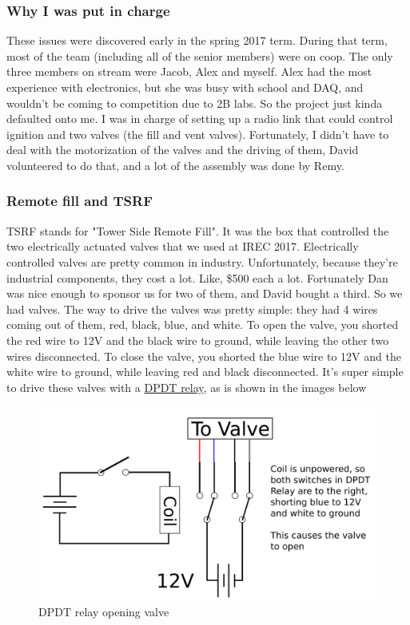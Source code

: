 \documentclass[11pt]{article}
\begin{document}
\subsubsection{Why I was put in charge}
\label{sec:orgd3222d4}

These issues were discovered early in the spring 2017 term. During that term,
most of the team (including all of the senior members) were on coop. The only
three members on stream were Jacob, Alex and myself. Alex had the most
experience with electronics, but she was busy with school and DAQ, and wouldn't
be coming to competition due to 2B labs. So the project just kinda defaulted
onto me. I was in charge of setting up a radio link that could control ignition
and two valves (the fill and vent valves). Fortunately, I didn't have to deal
with the motorization of the valves and the driving of them, David volunteered
to do that, and a lot of the assembly was done by Remy.

\subsubsection{Remote fill and TSRF}
\label{sec:orgbfaefa1}

TSRF stands for "Tower Side Remote Fill". It was the box that controlled the two
electrically actuated valves that we used at IREC 2017. Electrically controlled
valves are pretty common in industry. Unfortunately, because they're industrial
components, they cost a lot. Like, \$500 each a lot. Fortunately Dan was nice
enough to sponsor us for two of them, and David bought a third. So we had
valves. The way to drive the valves was pretty simple: they had 4 wires coming
out of them, red, black, blue, and white. To open the valve, you shorted the red
wire to 12V and the black wire to ground, while leaving the other two wires
disconnected. To close the valve, you shorted the blue wire to 12V and the white
wire to ground, while leaving red and black disconnected. It's super simple to
drive these valves with a \href{https://en.wikipedia.org/wiki/Relay\#Pole\_and\_throw}{DPDT relay}, as is shown in the images below

\begin{figure}[htbp]
\centering
\includegraphics[width=.9\linewidth]{./images/dpdt_opening.png}
\caption{\label{fig:org863402e}
DPDT relay opening valve}
\end{figure}
\end{document}

